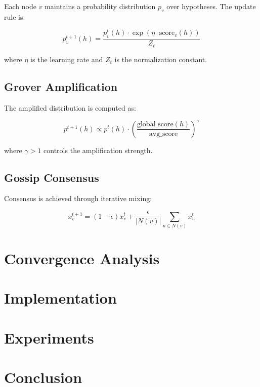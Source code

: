 \documentclass[10pt,a4paper]{article}
\begin{document}
Each node $v$ maintains a probability distribution $p_v$ over hypotheses. The update rule is:

\begin{equation}
p_v^{t+1}(h) = \frac{p_v^t(h) \cdot \exp(\eta \cdot \text{score}_v(h))}{Z_t}
\end{equation}

where $\eta$ is the learning rate and $Z_t$ is the normalization constant.

\subsection{Grover Amplification}

The amplified distribution is computed as:

\begin{equation}
p^{t+1}(h) \propto p^t(h) \cdot \left(\frac{\text{global\_score}(h)}{\text{avg\_score}}\right)^\gamma
\end{equation}

where $\gamma > 1$ controls the amplification strength.

\subsection{Gossip Consensus}

Consensus is achieved through iterative mixing:

\begin{equation}
x_v^{t+1} = (1 - \epsilon)x_v^t + \frac{\epsilon}{|N(v)|} \sum_{u \in N(v)} x_u^t
\end{equation}

\section{Convergence Analysis}

\section{Implementation}

\section{Experiments}

\section{Conclusion}



\end{document}
